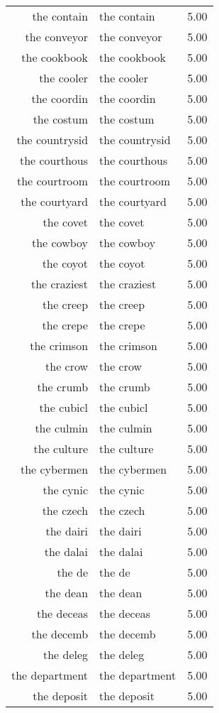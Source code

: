 \begin{table}[ht]
\begin{tabular}{rlr}
  the contain & the contain & 5.00 \\ 
  the conveyor & the conveyor & 5.00 \\ 
  the cookbook & the cookbook & 5.00 \\ 
  the cooler & the cooler & 5.00 \\ 
  the coordin & the coordin & 5.00 \\ 
  the costum & the costum & 5.00 \\ 
  the countrysid & the countrysid & 5.00 \\ 
  the courthous & the courthous & 5.00 \\ 
  the courtroom & the courtroom & 5.00 \\ 
  the courtyard & the courtyard & 5.00 \\ 
  the covet & the covet & 5.00 \\ 
  the cowboy & the cowboy & 5.00 \\ 
  the coyot & the coyot & 5.00 \\ 
  the craziest & the craziest & 5.00 \\ 
  the creep & the creep & 5.00 \\ 
  the crepe & the crepe & 5.00 \\ 
  the crimson & the crimson & 5.00 \\ 
  the crow & the crow & 5.00 \\ 
  the crumb & the crumb & 5.00 \\ 
  the cubicl & the cubicl & 5.00 \\ 
  the culmin & the culmin & 5.00 \\ 
  the culture & the culture & 5.00 \\ 
  the cybermen & the cybermen & 5.00 \\ 
  the cynic & the cynic & 5.00 \\ 
  the czech & the czech & 5.00 \\ 
  the dairi & the dairi & 5.00 \\ 
  the dalai & the dalai & 5.00 \\ 
  the de & the de & 5.00 \\ 
  the dean & the dean & 5.00 \\ 
  the deceas & the deceas & 5.00 \\ 
  the decemb & the decemb & 5.00 \\ 
  the deleg & the deleg & 5.00 \\ 
  the department & the department & 5.00 \\ 
  the deposit & the deposit & 5.00 \\ 

\end{tabular}
\end{table}
